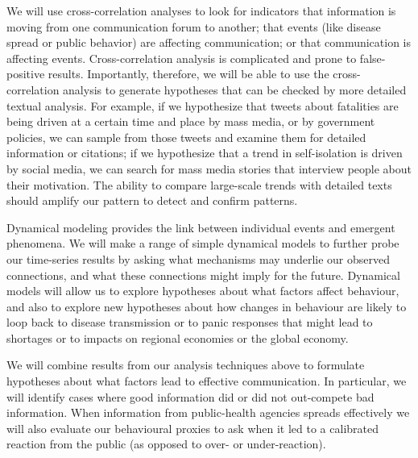 
We will use cross-correlation analyses to look for indicators that information is moving from one communication forum to another; that events (like disease spread or public behavior) are affecting communication; or that communication is affecting events. 
Cross-correlation analysis is complicated and prone to false-positive results. Importantly, therefore, we will be able to use the cross-correlation analysis to generate hypotheses that can be checked by more detailed textual analysis. For example, if we hypothesize that tweets about fatalities are being driven at a certain time and place by mass media, or by government policies, we can sample from those tweets and examine them for detailed information or citations; if we hypothesize that a trend in self-isolation is driven by social media, we can search for mass media stories that interview people about their motivation. The ability to compare large-scale trends with detailed texts should amplify our pattern to detect and confirm patterns. 

 Dynamical modeling provides the link between individual events and emergent phenomena. We will make a range of simple dynamical models to further probe our time-series results by asking what mechanisms may underlie our observed connections, and what these connections might imply for the future. Dynamical models will allow us to explore hypotheses about what factors affect behaviour, and also to explore new hypotheses about how changes in behaviour are likely to loop back to disease transmission or to panic responses that might lead to shortages or to impacts on regional economies or the global economy.


We will combine results from our analysis techniques above to formulate hypotheses about what factors lead to effective communication. In particular, we will identify cases where good information did or did not out-compete bad information. When information from public-health agencies spreads effectively we will also evaluate our behavioural proxies to ask when it led to a calibrated reaction from the public (as opposed to over- or under-reaction).


